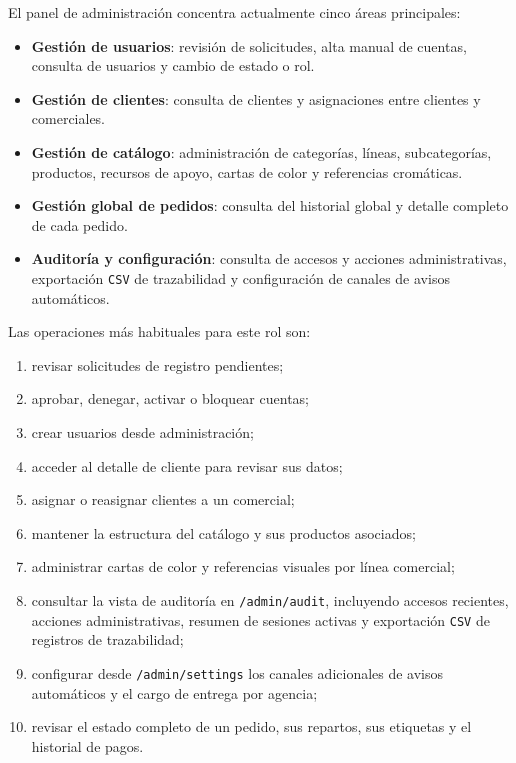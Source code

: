 El panel de administración concentra actualmente cinco áreas principales:

\begin{itemize}
    \item \textbf{Gestión de usuarios}: revisión de solicitudes, alta manual de cuentas, consulta de usuarios y cambio de estado o rol.
    \item \textbf{Gestión de clientes}: consulta de clientes y asignaciones entre clientes y comerciales.
    \item \textbf{Gestión de catálogo}: administración de categorías, líneas, subcategorías, productos, recursos de apoyo, cartas de color y referencias cromáticas.
    \item \textbf{Gestión global de pedidos}: consulta del historial global y detalle completo de cada pedido.
    \item \textbf{Auditoría y configuración}: consulta de accesos y acciones administrativas, exportación \texttt{CSV} de trazabilidad y configuración de canales de avisos automáticos.
\end{itemize}

Las operaciones más habituales para este rol son:

\begin{enumerate}
    \item revisar solicitudes de registro pendientes;
    \item aprobar, denegar, activar o bloquear cuentas;
    \item crear usuarios desde administración;
    \item acceder al detalle de cliente para revisar sus datos;
    \item asignar o reasignar clientes a un comercial;
    \item mantener la estructura del catálogo y sus productos asociados;
    \item administrar cartas de color y referencias visuales por línea comercial;
    \item consultar la vista de auditoría en \texttt{/admin/audit}, incluyendo accesos recientes, acciones administrativas, resumen de sesiones activas y exportación \texttt{CSV} de registros de trazabilidad;
    \item configurar desde \texttt{/admin/settings} los canales adicionales de avisos automáticos y el cargo de entrega por agencia;
    \item revisar el estado completo de un pedido, sus repartos, sus etiquetas y el historial de pagos.
\end{enumerate}


